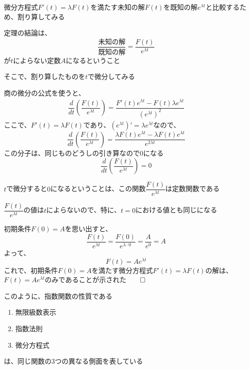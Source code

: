 \documentclass[../book_jiriki_calc]{subfiles}
\begin{document}
\br

微分方程式$F'(t)=\lambda F(t)$を満たす未知の解$F(t)$を既知の解$e^{\lambda t}$と比較するため、割り算してみる

\br

定理の結論は、
\begin{equation}
  \dfrac{\text{未知の解}}{\text{既知の解}} = \dfrac{F(t)}{e^{\lambda t}}
\end{equation}
が$t$によらない定数$A$になるということ

\br

そこで、割り算したものを$t$で微分してみる

商の微分の公式を使うと、
\begin{align}
  \dfrac{d}{dt}\left(\dfrac{F(t)}{e^{\lambda t}}\right) = \dfrac{F'(t)e^{\lambda t} - F(t)\lambda e^{\lambda t}}{(e^{\lambda t})^2}
\end{align}
ここで、$F'(t)=\lambda F(t)$であり、$(e^{\lambda t})'=\lambda e^{\lambda t}$なので、
\begin{equation}
  \dfrac{d}{dt}\left(\dfrac{F(t)}{e^{\lambda t}}\right) = \dfrac{\lambda F(t)e^{\lambda t} - \lambda F(t)e^{\lambda t}}{e^{2\lambda t}}
\end{equation}
この分子は、同じものどうしの引き算なので$0$になる
\begin{equation}
  \dfrac{d}{dt}\left(\dfrac{F(t)}{e^{\lambda t}}\right) = 0
\end{equation}

$t$で微分すると$0$になるということは、この関数$\dfrac{F(t)}{e^{\lambda t}}$は定数関数である

\br

$\dfrac{F(t)}{e^{\lambda t}}$の値は$t$によらないので、特に、$t=0$における値とも同じになる

初期条件$F(0)=A$を思い出すと、
\begin{equation}
  \dfrac{F(t)}{e^{\lambda t}} = \dfrac{F(0)}{e^{\lambda \cdot 0}} = \dfrac{A}{e^0} = A
\end{equation}
よって、
\begin{equation}
  F(t) = Ae^{\lambda t}
\end{equation}
これで、初期条件$F(0)=A$を満たす微分方程式$F'(t)=\lambda F(t)$の解は、$F(t)=Ae^{\lambda t}$のみであることが示された$\qed$

\sectionline

このように、指数関数の性質である
\begin{enumerate}
  \item 無限級数表示
  \item 指数法則
  \item 微分方程式
\end{enumerate}
は、同じ関数の3つの異なる側面を表している
\end{document}
